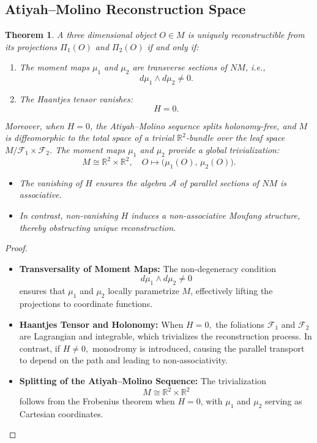 \documentclass[runningheads]{llncs}
\newtheorem{thm}{Theorem}
\begin{document}
\subsection{Atiyah--Molino Reconstruction Space}
\begin{thm}
A three dimensional object \( O \in M \) is uniquely reconstructible from its projections \( \Pi_1(O) \) and \( \Pi_2(O) \) if and only if:
\begin{enumerate}
    \item The moment maps \( \mu_1 \) and \( \mu_2 \) are transverse sections of \( NM \), i.e.,
    \[
    d\mu_1 \wedge d\mu_2 \neq 0.
    \]
    \item The Haantjes tensor vanishes:
    \[
    H = 0.
    \]
\end{enumerate}

Moreover, when \( H = 0 \), the Atiyah--Molino sequence splits holonomy-free, and \( M \) is diffeomorphic to the total space of a trivial \( \mathbb{R}^2 \)-bundle over the leaf space \( M/\mathcal{F}_1 \times \mathcal{F}_2 \). The moment maps \( \mu_1 \) and \( \mu_2 \) provide a global trivialization:
\[
M \cong \mathbb{R}^2 \times \mathbb{R}^2, \quad O \mapsto \bigl( \mu_1(O),\, \mu_2(O) \bigr).
\]

\begin{itemize}
\item The vanishing of \( H \) ensures the algebra \( \mathcal{A} \) of parallel sections of \( NM \) is associative.
\item  In contrast, non-vanishing \( H \) induces a non-associative Moufang structure, thereby obstructing unique reconstruction.
\end{itemize}

\end{thm}

\begin{proof}~
\begin{itemize}
    \item \textbf{Transversality of Moment Maps:} The non-degeneracy condition 
    \[
    d\mu_1 \wedge d\mu_2 \neq 0
    \]
    ensures that \(\mu_1\) and \(\mu_2\) locally parametrize \(M\), effectively lifting the projections to coordinate functions.
    
    \item \textbf{Haantjes Tensor and Holonomy:} When   $H = 0,$ the foliations \(\mathcal{F}_1\) and \(\mathcal{F}_2\) are Lagrangian and integrable, which trivializes the reconstruction process. In contrast, if 
$ H \neq 0,$ monodromy is introduced, causing the parallel transport to depend on the path and leading to non-associativity.
    
    \item \textbf{Splitting of the Atiyah--Molino Sequence:} The trivialization 
    \[
    M \cong \mathbb{R}^2 \times \mathbb{R}^2
    \]
    follows from the Frobenius theorem when \(H = 0\), with \(\mu_1\) and \(\mu_2\) serving as Cartesian coordinates.
\end{itemize}
\end{proof}
\end{document}
